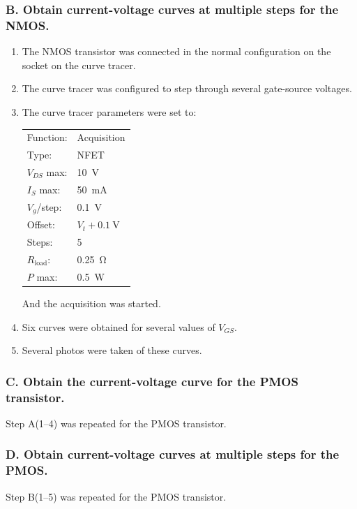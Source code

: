 \documentclass{report}
\begin{document}
\subsubsection{B. Obtain current-voltage curves at multiple steps for the NMOS.}
\begin{enumerate}
	\item The NMOS transistor was connected in the normal configuration on the socket on the curve tracer.
	\item The curve tracer was configured to step through several gate-source voltages.
	\item The curve tracer parameters were set to:
	
	\begin{tabular}{ll}
	Function: & Acquisition \\
	Type: & NFET \\
	$V_{DS}$ max: & \SI{10}{\V} \\
	$I_S$ max: & \SI{50}{\mA} \\
	$V_g$/step: & \SI{0.1}{\V} \\
	Offset: & $V_t  + \SI{0.1}{\V}$ \\
	Steps: & 5 \\
	$R_\mathrm{load}$: & \SI{0.25}{\ohm} \\
	$P$ max: & \SI{0.5}{\W}
	\end{tabular}
	
	And the acquisition was started.
	\item Six curves were obtained for several values of $V_{GS}$.
	\item Several photos were taken of these curves.
\end{enumerate}

\subsubsection{C. Obtain the current-voltage curve for the PMOS transistor.}
Step A(1--4) was repeated for the PMOS transistor.
\subsubsection{D. Obtain current-voltage curves at multiple steps for the PMOS.}
Step B(1--5) was repeated for the PMOS transistor.
\end{document}
